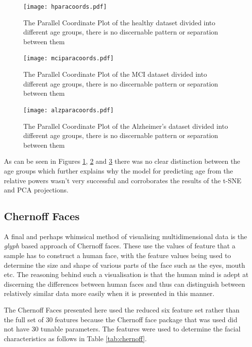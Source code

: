 \begin{figure}[h!]
  \centering
    \texttt{[image: hparacoords.pdf]}
    \caption{The Parallel Coordinate Plot of the healthy dataset divided into different age groups, there is no discernable pattern or separation between them}
    \label{fig:hparacoords}
\end{figure}


\begin{figure}[h!]
  \centering
    \texttt{[image: mciparacoords.pdf]}
    \caption{The Parallel Coordinate Plot of the MCI dataset divided into different age groups, there is no discernable pattern or separation between them}
    \label{fig:mciparacoords}
\end{figure}


\begin{figure}[h!]
  \centering
    \texttt{[image: alzparacoords.pdf]}
    \caption{The Parallel Coordinate Plot of the Alzheimer's dataset divided into different age groups, there is no discernable pattern or separation between them}
    \label{fig:alzparacoords}
\end{figure}

As can be seen in Figures \ref{fig:hparacoords}, \ref{fig:mciparacoords} and \ref{fig:alzparacoords} there was no clear distinction between the age groups which further explains why the model for predicting age from the relative powers wasn't very successful and corroborates the results of the t-SNE and PCA projections.


\subsection{Chernoff Faces}

A final and perhaps whimsical method of visualising multidimensional data is the \textit{glyph} based approach of Chernoff faces. These use the values of feature that a sample has to construct a human face, with the feature values being used to determine the size and shape of various parts of the face such as the eyes, mouth etc. The reasoning behind such a visualisation is that the human mind is adept at discerning the differences between human faces and thus can distinguish between relatively similar data more easily when it is presented in this manner. \cite{Chernoff1973}

The Chernoff Faces presented here used the reduced six feature set rather than the full set of 30 features because the Chernoff face package that was used did not have 30 tunable parameters. The features were used to determine the facial characteristics as follows in Table \ref{tab:chernoff}.


